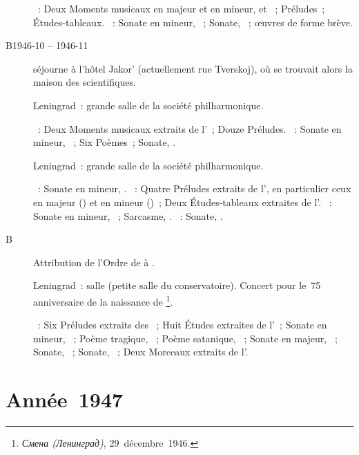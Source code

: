\begin{description}
 \textsc{\Rachmaninov{}}~: Deux Moments musicaux en \kD \Flat majeur et en
 \kB mineur,   et ~; Préludes~;
 Études-tableaux.
 \textsc{\Scriabine{}}~: Sonate en \kF \Sharp mineur, ~; Sonate,
 ~; œuvres de forme brève.
 \item[B1946-10 -- 1946-11]
 \VSofronitsky{} séjourne à l'hôtel Jakor' (actuellement rue Tverskoj), où
 se trouvait alors la maison des scientifiques.
 \item[\DateWithWeekDay{1946-12-16}]
 Leningrad~: grande salle de la société philharmonique.

 \textsc{\Rachmaninov{}}~: Deux Moments musicaux extraits de l'~;
 Douze Préludes.
 \textsc{\Scriabine{}}~: Sonate en \kF \Sharp mineur, ~; Six
 Poèmes~; Sonate, .
 \item[\DateWithWeekDay{1946-12-17}]
 Leningrad~: grande salle de la société philharmonique.

 \textsc{\Glazounov{}}~: Sonate en \kB \Flat mineur, .
 \textsc{\Rachmaninov{}}~: Quatre Préludes extraits de l', en
 particulier ceux en \kD majeur () et en \kC mineur ()~;
 Deux Études-tableaux extraites de l'.
 \textsc{\Prokofiev{}}~: Sonate en \kA mineur, ~; Sarcasme,
  .
 \textsc{\Scriabine{}}~: Sonate, .
 \item[B\DateWithWeekDay{1946-12-28}]
 Attribution de l'\hbox{Ordre} de \Lenin{} à \VSofronitsky{}.
 \item[\DateWithWeekDay{1946-12-29}]
 Leningrad~: salle \Glazounov{} (petite salle du conservatoire).
 Concert pour le~75\ieme{} anniversaire de la naissance de \Scriabine{}%
 \footnote{\foreignlanguage{russian}{\emph{Смена (Ленинград)}},
 29~décembre~1946.}.

 \textsc{\Scriabine{}}~: Six Préludes extraits des ~;
 Huit Études extraites de l'~; Sonate en \kF \Sharp mineur,
 ~; Poème tragique, ~; Poème satanique, ~; Sonate
 en \kF \Sharp majeur, ~; Sonate, ~; Sonate, ~;
 Deux Morceaux extraits de l'.
\end{description}

\section{Année~1947}

